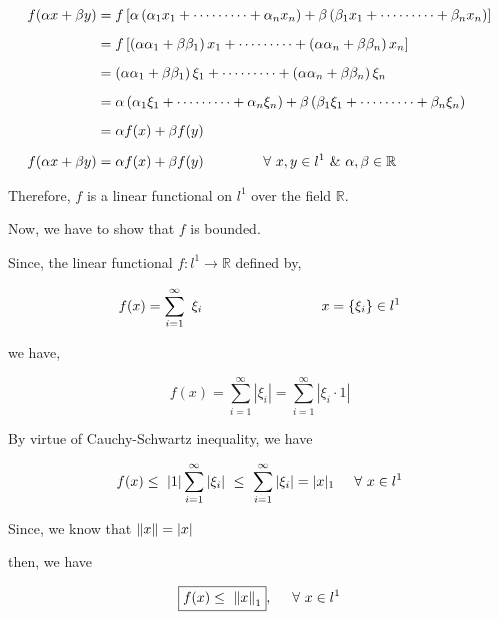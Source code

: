 \documentclass[a4paper,12pt]{article}
\begin{document}
    \begin{equation*}
        \begin{split}
            f(\alpha x + \beta y) & = f\left[\alpha \left(\alpha_1 x_1 + \cdots \cdots \cdots + \alpha_n x_n\right) + \beta\left(\beta_1 x_1 + \cdots \cdots \cdots + \beta_n x_n\right)\right]\\[2mm]
            & = f\left[\left(\alpha \alpha_1 + \beta \beta_1\right)x_1 + \cdots \cdots \cdots + \left(\alpha \alpha_n + \beta \beta_n\right)x_n\right]\\[2mm]
            & = \left(\alpha \alpha_1 + \beta \beta_1\right)\xi_1 +  \cdots \cdots \cdots + \left(\alpha \alpha_n + \beta \beta_n\right)\xi_n\\[2mm]
            & = \alpha\left(\alpha_1 \xi_1 + \cdots \cdots \cdots + \alpha_n \xi_n\right) + \beta\left(\beta_1 \xi_1 + \cdots \cdots \cdots + \beta_n \xi_n\right)\\[2mm]
            & = \alpha f(x)  + \beta f(y)\\[2mm]
            f(\alpha x + \beta y) & = \alpha f(x)  + \beta f(y) \hspace*{1.5cm} \forall\ x,y\in l^1\ \& \ \alpha, \beta \in \mathbb{R}
        \end{split}
    \end{equation*}

    Therefore, $f$ is a linear functional on $l^1$ over the field $\mathbb{R}$.

    \vspace*{0.3cm}
    
    Now, we have to show that $f$ is bounded.

    Since, the linear functional $f : l^1 \to \mathbb{R}$ defined by,

    \[f(x) = \sum_{i=1}^{\infty}\ \xi_i\hspace*{3cm} x = \left\{\xi_i\right\} \in l^1\]

    we have,

    \[f(x) = \sum_{i=1}^{\infty} |\xi_i| =  \sum_{i=1}^{\infty} |\xi_i \cdot 1|\]

    By virtue of Cauchy-Schwartz inequality, we have

    \[f(x) \leq\ |1|\sum_{i=1}^{\infty}|\xi_i|\  \leq\  \sum_{i=1}^{\infty}|\xi_i| = |x|_1 \hspace*{0.5cm} \forall\ x\in l^1 \]

    Since, we know that $\norm{x} = |x|$

    then, we have

    \[\boxed{f(x) \leq\ \norm{x}_1},\hspace*{0.5cm} \forall\ x\in l^1\]
\end{document}
